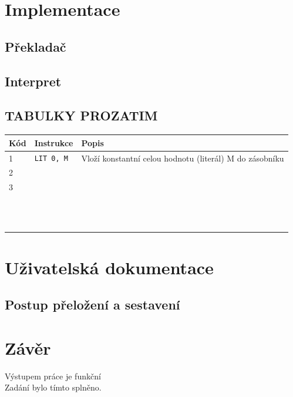 \documentclass[
12pt,
a4paper,
pdftex,
czech,
titlepage
]{report}
\begin{document}
\chapter{Implementace}
\section{Překladač}
\section{Interpret}
\section{TABULKY PROZATIM}
\begin{table}[]
\centering
\caption{Instrukce}
\label{my-label}
\begin{longtable}{|l|l|l|}
\hline
		Kód & Instrukce & Popis \\ 
\hline\hline
\rule{0pt}{2ex}1 & \texttt{LIT 0, M} & Vloží konstantní celou hodnotu (literál) M do zásobníku \\ \hline
2 &          &                                                         \\ \hline
3 &          &                                                         \\ \hline
  &          &                                                         \\ \hline
  &          &                                                         \\ \hline
  &          &                                                         \\ \hline
  &          &                                                         \\ \hline
  &          &                                                         \\ \hline
  &          &                                                         \\ \hline
  &          &                                                         \\ \hline
  &          &                                                         \\ \hline
  &          &                                                         \\ \hline
  &          &                                                         \\ \hline
  &          &                                                         \\ \hline
  &          &                                                         \\ \hline
\end{longtable}
\end{table}
\chapter{Uživatelská dokumentace} 
\section{Postup přeložení a sestavení}

\chapter{Závěr}
Výstupem práce je funkční \\
Zadání bylo tímto splněno.
\end{document}
